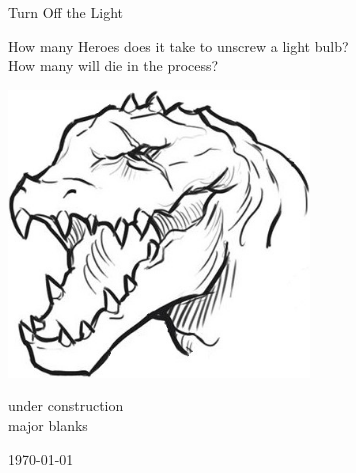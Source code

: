 















\thispagestyle{empty}

\null          %
\vspace{1cm}   %

\begin{center}

\huge
Turn Off the Light

\vspace{0.3\baselineskip}

\large
How many Heroes does it take to unscrew a light bulb?\\
How many will die in the process?

\vspace{2cm}

\includegraphics[width=80mm]{./fig/lizardman-head.jpg}

\vspace{2 cm}


\normalsize
under construction\\
major blanks

\vfill

\today

\end{center}






